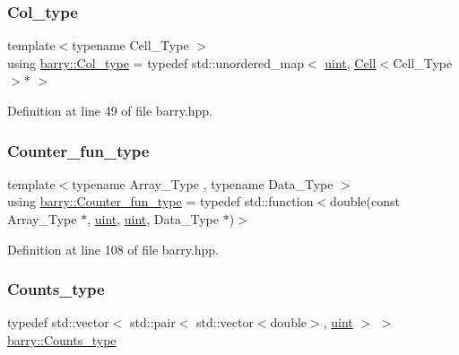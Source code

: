 \subsubsection{\texorpdfstring{Col\+\_\+type}{Col\_type}}
{\footnotesize\ttfamily template$<$typename Cell\+\_\+\+Type $>$ \\
using \hyperlink{namespacebarry_adc551002e63e38057d304f78d7756308}{barry\+::\+Col\+\_\+type} = typedef std\+::unordered\+\_\+map$<$ \hyperlink{namespacebarry_a11dfc53ddb4672278319aa04f1e09a6c}{uint}, \hyperlink{classbarry_1_1_cell}{Cell}$<$Cell\+\_\+\+Type$>$$\ast$ $>$}



Definition at line 49 of file barry.\+hpp.

\mbox{\label{namespacebarry_abaaae3200da8e4b7faac3c04fe9c3081}} 
\subsubsection{\texorpdfstring{Counter\+\_\+fun\+\_\+type}{Counter\_fun\_type}}
{\footnotesize\ttfamily template$<$typename Array\+\_\+\+Type , typename Data\+\_\+\+Type $>$ \\
using \hyperlink{namespacebarry_abaaae3200da8e4b7faac3c04fe9c3081}{barry\+::\+Counter\+\_\+fun\+\_\+type} = typedef std\+::function$<$double(const Array\+\_\+\+Type $\ast$, \hyperlink{namespacebarry_a11dfc53ddb4672278319aa04f1e09a6c}{uint}, \hyperlink{namespacebarry_a11dfc53ddb4672278319aa04f1e09a6c}{uint}, Data\+\_\+\+Type $\ast$)$>$}



Definition at line 108 of file barry.\+hpp.

\mbox{\label{namespacebarry_a3e2d8c3b6cf602107559d4237d9f1315}} 
\subsubsection{\texorpdfstring{Counts\+\_\+type}{Counts\_type}}
{\footnotesize\ttfamily typedef std\+::vector$<$ std\+::pair$<$ std\+::vector$<$double$>$, \hyperlink{namespacebarry_a11dfc53ddb4672278319aa04f1e09a6c}{uint} $>$ $>$ \hyperlink{namespacebarry_a3e2d8c3b6cf602107559d4237d9f1315}{barry\+::\+Counts\+\_\+type}}




